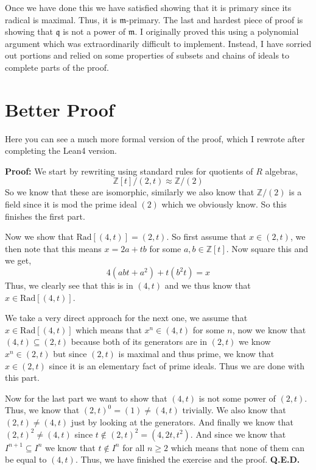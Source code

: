 \documentclass{article}
\begin{document}
\medskip

Once we have done this we have satisfied showing that it is primary since its radical is maximal. Thus, it is $\mathfrak{m}$-primary. The last and hardest piece of proof is showing that $\mathfrak{q}$ is not a power of $\mathfrak{m}$. I originally proved this using a polynomial argument which was extraordinarily difficult to implement. Instead, I have sorried out portions and relied on some properties of subsets and chains of ideals to complete parts of the proof. 

\section{Better Proof}

Here you can see a much more formal version of the proof, which I rewrote after completing the Lean4 version. 

\medskip
\noindent
\textbf{Proof:} We start by rewriting using standard rules for quotients of $R$ algebras, $$\mathbb{Z}[t]/(2,t) \approx \mathbb{Z}/(2)$$ So we know that these are isomorphic, similarly we also know that $\mathbb{Z}/(2)$ is a field since it is mod the prime ideal $(2)$ which we obviously know. So this finishes the first part.

\medskip
\noindent
Now we show that $\text{Rad}\left[(4,t)\right] = (2,t)$. So first assume that $x \in (2,t)$, we then note that this means $x = 2a + tb$ for some $a,b \in \mathbb{Z}[t]$. Now square this and we get, $$4(abt+a^2)+t(b^2t) = x$$ Thus, we clearly see that this is in $(4,t)$ and we thus know that $x \in \text{Rad}[(4,t)]$.

\medskip
\noindent
We take a very direct approach for the next one, we assume that $x \in \text{Rad}\left[(4,t)\right]$ which means that $x^n \in (4,t)$ for some $n$, now we know that $(4,t) \subseteq (2,t)$ because both of its generators are in $(2,t)$ we know $x^n \in (2,t)$ but since $(2,t)$ is maximal and thus prime, we know that $x \in (2,t)$ since it is an elementary fact of prime ideals. Thus we are done with this part.

\medskip
\noindent
Now for the last part we want to show that $(4,t)$ is not some power of $(2,t)$. Thus, we know that $(2,t)^0 = (1) \not = (4,t)$ trivially. We also know that $(2,t) \not = (4,t)$ just by looking at the generators. And finally we know that $(2,t)^2 \not = (4,t)$ since $t \not \in (2,t)^2 = (4,2t,t^2)$. And since we know that $I^{n+1} \subseteq I^n$ we know that $t \not \in I^n$ for all $n \geq 2$ which means that none of them can be equal to $(4,t)$. Thus, we have finished the exercise and the proof. \textbf{Q.E.D.}
\end{document}
